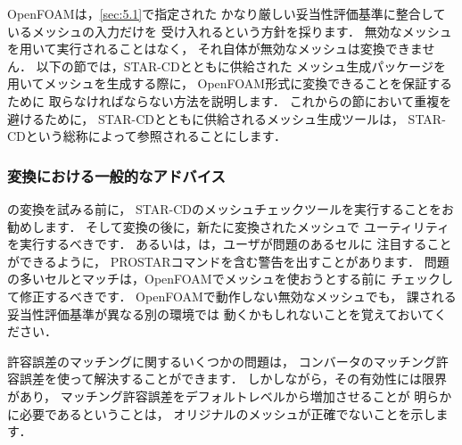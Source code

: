 OpenFOAMは，\autoref{sec:5.1}で指定された
かなり厳しい妥当性評価基準に整合しているメッシュの入力だけを
受け入れるという方針を採ります．
無効なメッシュを用いて実行されることはなく，
それ自体が無効なメッシュは変換できません．
以下の節では，STAR-CDとともに供給された
メッシュ生成パッケージを用いてメッシュを生成する際に，
OpenFOAM形式に変換できることを保証するために
取らなければならない方法を説明します．
これからの節において重複を避けるために，
STAR-CDとともに供給されるメッシュ生成ツールは，
STAR-CDという総称によって参照されることにします．

\subsubsection{変換における一般的なアドバイス}
\label{sssec:5.5.2.1}
の変換を試みる前に，
STAR-CDのメッシュチェックツールを実行することをお勧めします．
そして変換の後に，新たに変換されたメッシュで
%
%
ユーティリティを実行するべきです．
あるいは，は，ユーザが問題のあるセルに
注目することができるように，
\textsf{PROSTAR}コマンドを含む警告を出すことがあります．
問題の多いセルとマッチは，OpenFOAMでメッシュを使おうとする前に
チェックして修正するべきです．
OpenFOAMで動作しない無効なメッシュでも，
課される妥当性評価基準が異なる別の環境では
動くかもしれないことを覚えておいてください．

許容誤差のマッチングに関するいくつかの問題は，
コンバータのマッチング許容誤差を使って解決することができます．
しかしながら，その有効性には限界があり，
マッチング許容誤差をデフォルトレベルから増加させることが
明らかに必要であるということは，
オリジナルのメッシュが正確でないことを示します．

